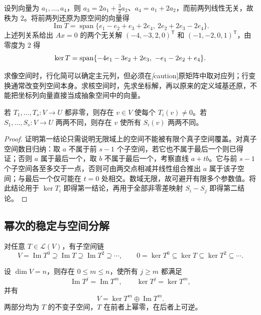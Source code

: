 \begin{solve}
设列向量为 $a_1,\ldots,a_4$，则 $a_3=2a_1+\tfrac32a_2$、$a_4=a_1+2a_2$，而前两列线性无关，故秩为 $2$。将前两列还原为原空间的向量得
\[
    \operatorname{Im}T=
    \operatorname{span}\{e_1-e_2+e_3+2e_4,\ 2e_2+2e_3-2e_4\}.
\]
上述列关系给出 $Ax=0$ 的两个无关解 $(-4,-3,2,0)^{\mathsf T}$ 和 $(-1,-2,0,1)^{\mathsf T}$，由零度为 $2$ 得
\[
    \ker T=\operatorname{span}
    \{-4e_1-3e_2+2e_3,\ -e_1-2e_2+e_4\}.\qedhere
\]
\end{solve}

求像空间时，行化简可以确定主元列，但必须在\emph[caution]{原矩阵}中取对应列；行变换通常改变列空间本身。求核空间时，先求坐标解，再以原来的定义域基还原，不能把坐标列向量直接当成抽象空间中的向量。

\begin{proposition}
\label{prop:xie-ex-separate-maps}
若 $T_1,\ldots,T_s:V\to U$ 都非零，则存在 $v\in V$ 使每个 $T_i(v)\ne0$。若 $S_1,\ldots,S_s:V\to U$ 两两不同，则存在 $v$ 使所有 $S_i(v)$ 两两不同。
\end{proposition}

\begin{proof}
证明第一结论只需说明无限域上的空间不能被有限个真子空间覆盖。对真子空间数目归纳：取 $a$ 不属于前 $s-1$ 个子空间，若它也不属于最后一个则已得证；否则 $a$ 属于最后一个，取 $b$ 不属于最后一个，考察直线 $a+tb$。它与前 $s-1$ 个子空间各至多交于一点，否则可由两交点相减并线性组合推出 $a$ 属于该子空间；与最后一个仅可能在 $t=0$ 处相交。数域无限，故可避开有限多个参数值。将此结论用于 $\ker T_i$ 即得第一结论，再用于全部非零差映射 $S_i-S_j$ 即得第二结论。
\end{proof}

\subsection{幂次的稳定与空间分解}

对任意 $T\in\mathcal L(V)$，有子空间链
\[
    V=\operatorname{Im}T^0\supseteq\operatorname{Im}T
    \supseteq\operatorname{Im}T^2\supseteq\cdots,
    \qquad
    0=\ker T^0\subseteq\ker T\subseteq\ker T^2\subseteq\cdots.
\]

\begin{theorem}
\label{thm:xie-ex-fitting}
设 $\dim V=n$，则存在 $0\leq m\leq n$，使所有 $j\geq m$ 都满足
\[
    \operatorname{Im}T^j=\operatorname{Im}T^m,\qquad
    \ker T^j=\ker T^m,
\]
并有
\begin{equation}
\label{eq:xie-ex-fitting}
    V=\ker T^m\oplus\operatorname{Im}T^m.
\end{equation}
两部分均为 $T$ 的不变子空间，$T$ 在前者上幂零，在后者上可逆。
\end{theorem}

